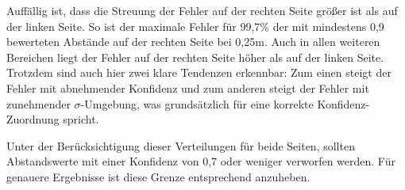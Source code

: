     Auffällig ist, dass die Streuung der Fehler auf der rechten Seite grö{\ss}er ist als auf der linken Seite. So ist der maximale Fehler für 99,7\% der mit mindestens 0,9 bewerteten Abstände auf der rechten Seite bei 0,25m. Auch in allen weiteren Bereichen liegt der Fehler auf der rechten Seite höher als auf der linken Seite. Trotzdem sind auch hier zwei klare Tendenzen erkennbar: Zum einen steigt der Fehler mit abnehmender Konfidenz und zum anderen steigt der Fehler mit zunehmender $\sigma$-Umgebung, was grundsätzlich für eine korrekte Konfidenz-Zuordnung spricht.

    Unter der Berücksichtigung dieser Verteilungen für beide Seiten, sollten Abstandswerte mit einer Konfidenz von 0,7 oder weniger verworfen werden. Für genauere Ergebnisse ist diese Grenze entsprechend anzuheben.

